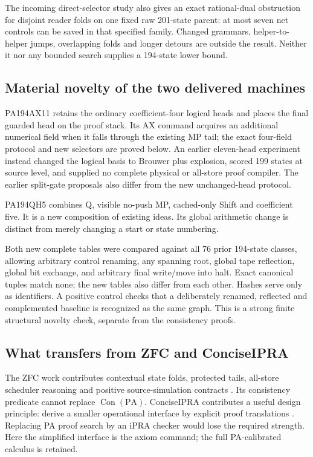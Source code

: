 The incoming direct-selector study also gives an exact rational-dual
obstruction for disjoint reader folds on one fixed raw 201-state parent:
at most seven net controls can be saved in that specified family.
Changed grammars, helper-to-helper jumps, overlapping folds and longer
detours are outside the result. Neither it nor any bounded search supplies
a 194-state lower bound.

\subsection{Material novelty of the two delivered machines}

PA194AX11 retains the ordinary coefficient-four logical heads and places
the final guarded head on the proof stack. Its AX command acquires an
additional numerical field when it falls through the existing MP tail;
the exact four-field protocol and new selectors are proved below.
An earlier eleven-head experiment instead changed the logical basis to
Brouwer plus explosion, scored 199 states at source level, and supplied no
complete physical or all-store proof compiler. The earlier split-gate
proposals also differ from the new unchanged-head protocol.

PA194QH5 combines Q, visible no-push MP, cached-only Shift and coefficient
five. It is a new composition of existing ideas. Its global arithmetic
change is distinct from merely changing a start or state numbering.

Both new complete tables were compared against all 76 prior 194-state
classes, allowing arbitrary control renaming, any spanning root, global
tape reflection, global bit exchange, and arbitrary final write/move into
halt. Exact canonical tuples match none; the new tables also differ from
each other. Hashes serve only as identifiers. A positive control checks
that a deliberately renamed, reflected and complemented baseline is
recognized as the same graph. This is a strong finite structural novelty
check, separate from the consistency proofs.

\subsection{What transfers from ZFC and ConciseIPRA}

The ZFC work contributes contextual state folds, protected tails,
all-store scheduler reasoning and positive source-simulation contracts
\cite{zfc}. Its consistency predicate cannot replace $\operatorname{Con}(\mathrm{PA})$.
ConciseIPRA contributes a useful design principle: derive a smaller
operational interface by explicit proof translations \cite{ipra}.
Replacing PA proof search by an iPRA checker would lose the required
strength. Here the simplified interface is the axiom command; the
full PA-calibrated calculus is retained.
